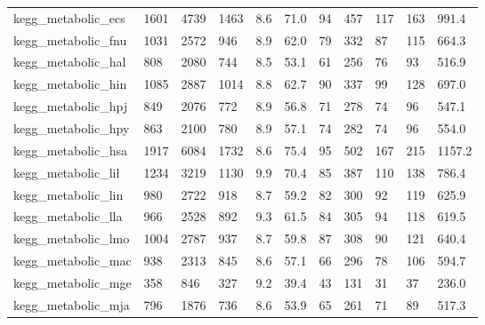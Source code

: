 \begin{longtable}{lllllllllll}
 kegg\_metabolic\_ecs                                 & 1601       & 4739      & 1463  & 8.6    & 71.0   & 94    & 457    & 117    & 163    & 991.4   \\
 kegg\_metabolic\_fnu                                 & 1031       & 2572      & 946   & 8.9    & 62.0   & 79    & 332    & 87     & 115    & 664.3   \\
 kegg\_metabolic\_hal                                 & 808        & 2080      & 744   & 8.5    & 53.1   & 61    & 256    & 76     & 93     & 516.9   \\
 kegg\_metabolic\_hin                                 & 1085       & 2887      & 1014  & 8.8    & 62.7   & 90    & 337    & 99     & 128    & 697.0   \\
 kegg\_metabolic\_hpj                                 & 849        & 2076      & 772   & 8.9    & 56.8   & 71    & 278    & 74     & 96     & 547.1   \\
 kegg\_metabolic\_hpy                                 & 863        & 2100      & 780   & 8.9    & 57.1   & 74    & 282    & 74     & 96     & 554.0   \\
 kegg\_metabolic\_hsa                                 & 1917       & 6084      & 1732  & 8.6    & 75.4   & 95    & 502    & 167    & 215    & 1157.2  \\
 kegg\_metabolic\_lil                                 & 1234       & 3219      & 1130  & 9.9    & 70.4   & 85    & 387    & 110    & 138    & 786.4   \\
 kegg\_metabolic\_lin                                 & 980        & 2722      & 918   & 8.7    & 59.2   & 82    & 300    & 92     & 119    & 625.9   \\
 kegg\_metabolic\_lla                                 & 966        & 2528      & 892   & 9.3    & 61.5   & 84    & 305    & 94     & 118    & 619.5   \\
 kegg\_metabolic\_lmo                                 & 1004       & 2787      & 937   & 8.7    & 59.8   & 87    & 308    & 90     & 121    & 640.4   \\
 kegg\_metabolic\_mac                                 & 938        & 2313      & 845   & 8.6    & 57.1   & 66    & 296    & 78     & 106    & 594.7   \\
 kegg\_metabolic\_mge                                 & 358        & 846       & 327   & 9.2    & 39.4   & 43    & 131    & 31     & 37     & 236.0   \\
 kegg\_metabolic\_mja                                 & 796        & 1876      & 736   & 8.6    & 53.9   & 65    & 261    & 71     & 89     & 517.3   \\

\end{longtable}
